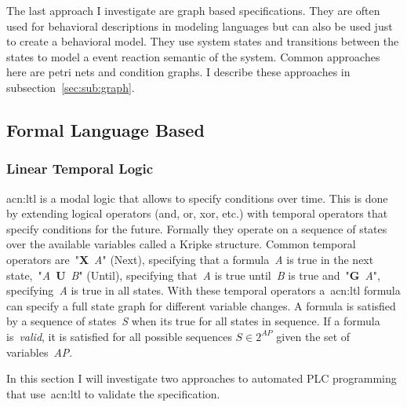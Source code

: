 The last approach I investigate are graph based specifications.
They are often used for behavioral descriptions in modeling languages but can also be used just to create a behavioral model.
They use system states and transitions between the states to model a event reaction semantic of the system.
Common approaches here are petri nets and condition graphs.
I describe these approaches in subsection~\ref{sec:sub:graph}.

\subsection{Formal Language Based}
\label{sec:sub:flb}

\subsubsection{Linear Temporal Logic}

\acrfull{acn:ltl} is a modal logic that allows to specify conditions over time.
This is done by extending logical operators (and, or, xor, etc.) with temporal operators that specify conditions for the future.
Formally they operate on a sequence of states over the available variables called a Kripke structure.
Common temporal operators are~"\textbf{X}~\textit{A}" (Next), specifying that a formula~\textit{A} is true in the next state,~"\textit{A}~\textbf{U}~\textit{B}" (Until), specifying that~\textit{A} is true until~\textit{B} is true and~"\textbf{G}~\textit{A}", specifying~\textit{A} is true in all states.
With these temporal operators a~\acrfull{acn:ltl} formula can specify a full state graph for different variable changes.
A formula is satisfied by a sequence of states~\textit{S} when its true for all states in sequence.
If a formula is~\textit{valid}, it is satisfied for all possible sequences $ S\in 2^{AP} $ given the set of variables~\textit{AP}.

In this section I will investigate two approaches to automated PLC programming that use~\acrshort{acn:ltl} to validate the specification.

